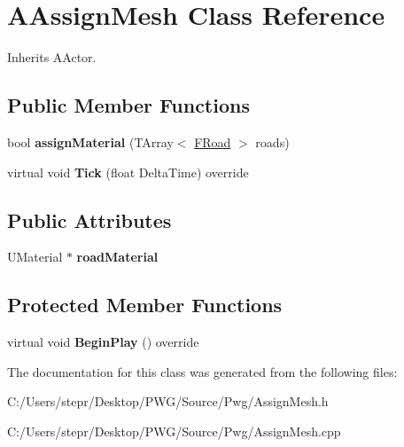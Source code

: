 \hypertarget{class_a_assign_mesh}{}\section{A\+Assign\+Mesh Class Reference}
\label{class_a_assign_mesh}


Inherits A\+Actor.

\subsection*{Public Member Functions}
\begin{DoxyCompactItemize}
\item 
\mbox{\label{class_a_assign_mesh_a0df1b2d779efbf80b4cfba839229ee54}} 
bool {\bfseries assign\+Material} (T\+Array$<$ \mbox{\hyperlink{struct_f_road}{F\+Road}} $>$ roads)
\item 
\mbox{\label{class_a_assign_mesh_a6e7cbef059f8f6ef9b2363fb11540d4d}} 
virtual void {\bfseries Tick} (float Delta\+Time) override
\end{DoxyCompactItemize}
\subsection*{Public Attributes}
\begin{DoxyCompactItemize}
\item 
\mbox{\label{class_a_assign_mesh_a52942dad5ef510bf2c6a43567edaf508}} 
U\+Material $\ast$ {\bfseries road\+Material}
\end{DoxyCompactItemize}
\subsection*{Protected Member Functions}
\begin{DoxyCompactItemize}
\item 
\mbox{\label{class_a_assign_mesh_a4ca3ebbe82015a741f0c0dd3a74cdb37}} 
virtual void {\bfseries Begin\+Play} () override
\end{DoxyCompactItemize}


The documentation for this class was generated from the following files\+:\begin{DoxyCompactItemize}
\item 
C\+:/\+Users/stepr/\+Desktop/\+P\+W\+G/\+Source/\+Pwg/Assign\+Mesh.\+h\item 
C\+:/\+Users/stepr/\+Desktop/\+P\+W\+G/\+Source/\+Pwg/Assign\+Mesh.\+cpp\end{DoxyCompactItemize}
